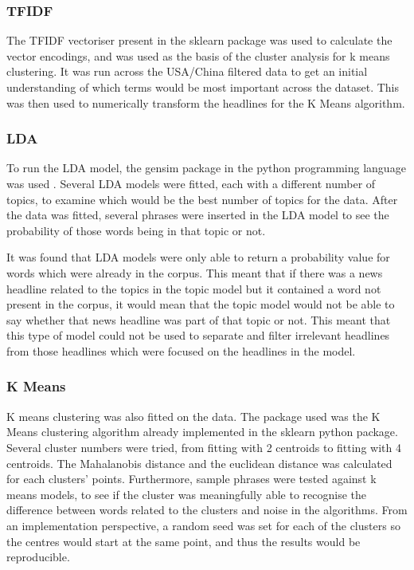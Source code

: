\subsubsection{TFIDF}
The TFIDF vectoriser present in the sklearn package was used to calculate the vector encodings, and was used as the basis of the cluster analysis for k means clustering. It was run across the USA/China filtered data to get an initial understanding of which terms would be most important across the dataset. This was then used to numerically transform the headlines for the K Means algorithm. 

\subsubsection{LDA}
To run the LDA model, the gensim package in the python programming language was used \cite{rehurek_lrec}. Several LDA models were fitted, each with a different number of topics, to examine which would be the best number of topics for the data. After the data was fitted, several phrases were inserted in the LDA model to see the probability of those words being in that topic or not. 

It was found that LDA models were only able to return a probability value for words which were already in the corpus. This meant that if there was a news headline related to the topics in the topic model but it contained a word not present in the corpus, it would mean that the topic model would not be able to say whether that news headline was part of that topic or not. This meant that this type of model could not be used to separate and filter irrelevant headlines from those headlines which were focused on the headlines in the model. 

\subsubsection{K Means}
K means clustering was also fitted on the data. The package used was the K Means clustering algorithm already implemented in the sklearn python package. Several cluster numbers were tried, from fitting with 2 centroids to fitting with 4 centroids. The Mahalanobis distance and the euclidean distance was calculated for each clusters' points. Furthermore, sample phrases were tested against k means models, to see if the cluster was meaningfully able to recognise the difference between words related to the clusters and noise in the algorithms. From an implementation perspective, a random seed was set for each of the clusters so the centres would start at the same point, and thus the results would be reproducible. 

